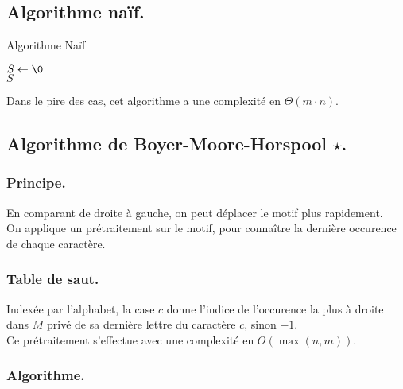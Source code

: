 \documentclass[french, 11pt]{article}
\begin{document}
\subsection{Algorithme naïf.}

\begin{defi}{}{}
    \begin{algorithm}[H]
        \caption{Algorithme Naïf}
        $S \gets \0$ \\
        \Retour $S$
    \end{algorithm}
    Dans le pire des cas, cet algorithme a une complexité en $\Theta(m\cdot n)$.
\end{defi}

\subsection{Algorithme de Boyer-Moore-Horspool \texorpdfstring{$\star$}{Lg}.}
\subsubsection{Principe.}

\begin{defi}{}{}
    En comparant de droite à gauche, on peut déplacer le motif plus rapidement.\\
    On applique un prétraitement sur le motif, pour connaître la dernière occurence de chaque caractère.
\end{defi}

\subsubsection{Table de saut.}

\begin{defi}{}{}
    Indexée par l'alphabet, la case $c$ donne l'indice de l'occurence la plus à droite dans $M$ privé de sa dernière lettre du caractère $c$, sinon $-1$.\\
    Ce prétraitement s'effectue avec une complexité en $O(\max(n,m))$.
\end{defi}

\subsubsection{Algorithme.}
\end{document}
